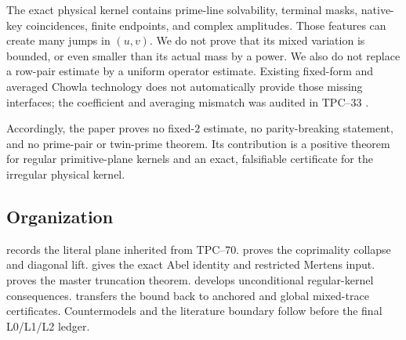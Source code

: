 The exact physical kernel contains prime-line solvability, terminal masks,
native-key coincidences, finite endpoints, and complex amplitudes.  Those
features can create many jumps in \((u,v)\).  We do not prove that its mixed
variation is bounded, or even smaller than its actual mass by a power.  We
also do not replace a row-pair estimate by a uniform operator estimate.
Existing fixed-form and averaged Chowla technology does not automatically
provide those missing interfaces; the coefficient and averaging mismatch
was audited in TPC--33 \citep{WangTPC33}.

Accordingly, the paper proves no fixed-\(2\) estimate, no parity-breaking
statement, and no prime-pair or twin-prime theorem.  Its contribution is a
positive theorem for regular primitive-plane kernels and an exact,
falsifiable certificate for the irregular physical kernel.

\subsection{Organization}

 records the literal plane inherited from
TPC--70.   proves the coprimality collapse and
diagonal lift.   gives the exact Abel identity and
restricted Mertens input.   proves the master
truncation theorem.   develops unconditional
regular-kernel consequences.   transfers the bound
back to anchored and global mixed-trace certificates.  Countermodels and the
literature boundary follow before the final L0/L1/L2 ledger.
